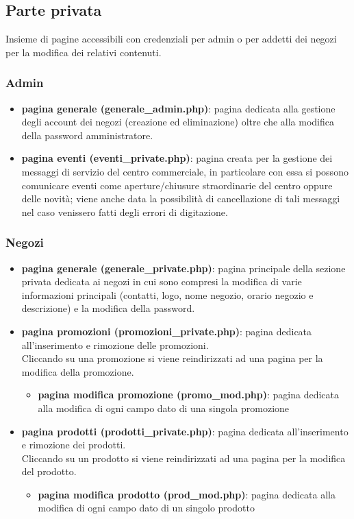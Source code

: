 \documentclass[a4paper,12pt]{article}
\begin{document}
\subsection{Parte privata}
Insieme di pagine accessibili con credenziali per admin o per addetti dei negozi per la modifica dei relativi contenuti.
\subsubsection{Admin}
\begin{itemize}
	\item \textbf{pagina generale (generale\_admin.php)}: pagina dedicata alla gestione degli account dei negozi (creazione ed eliminazione) oltre che alla modifica della password amministratore.
	\item \textbf{pagina eventi (eventi\_private.php)}: pagina creata per la gestione dei messaggi di servizio del centro commerciale, in particolare con essa si possono comunicare eventi come aperture/chiusure straordinarie del centro oppure delle novità; viene anche data la possibilità di cancellazione di tali messaggi nel caso venissero fatti degli errori di digitazione.
\end{itemize}
\subsubsection{Negozi}
\begin{itemize}
	\item \textbf{pagina generale (generale\_private.php)}: pagina principale della sezione privata dedicata ai negozi in cui sono compresi la modifica di varie informazioni principali (contatti, logo, nome negozio, orario negozio e descrizione) e la modifica della password.
	\item \textbf{pagina promozioni (promozioni\_private.php)}: pagina dedicata all'inserimento e rimozione delle promozioni.\\
	Cliccando su una promozione si viene reindirizzati ad una pagina per la modifica della promozione.
	\begin{itemize}
		\item \textbf{pagina modifica promozione (promo\_mod.php)}: pagina dedicata alla modifica di ogni campo dato di una singola promozione 
	\end{itemize}

	\item \textbf{pagina prodotti (prodotti\_private.php)}: pagina dedicata all'inserimento e rimozione dei prodotti.\\
	Cliccando su un prodotto si viene reindirizzati ad una pagina per la modifica del prodotto.
	\begin{itemize}
		\item \textbf{pagina modifica prodotto (prod\_mod.php)}: pagina dedicata alla modifica di ogni campo dato di un singolo prodotto
	\end{itemize}
	
\end{itemize}
\end{document}
